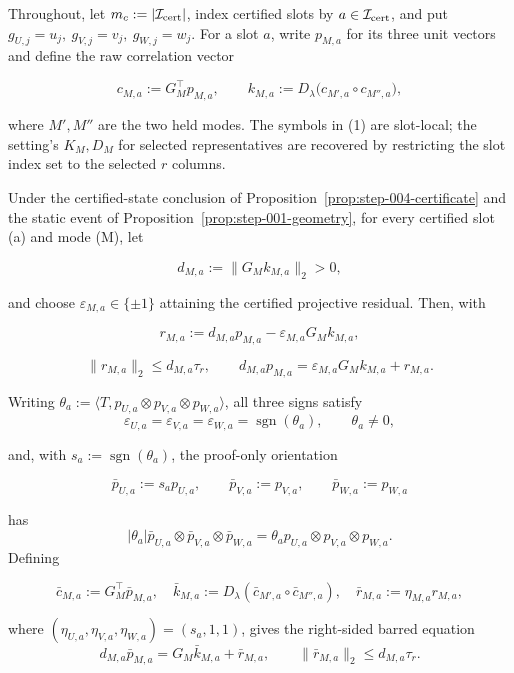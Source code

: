 Throughout, let $m_c:=|\mathcal I_{\rm cert}|$, index certified slots by
$a\in\mathcal I_{\rm cert}$, and put
$g_{U,j}=u_j,\ g_{V,j}=v_j,\ g_{W,j}=w_j$.  For a slot $a$, write
$p_{M,a}$ for its three unit vectors and define the raw correlation vector

\[
c_{M,a}:=G_M^\top p_{M,a},\qquad
k_{M,a}:=D_\lambda\bigl(c_{M',a}\circ c_{M'',a}\bigr),
\tag{1}
\]

where $M',M''$ are the two held modes.  The symbols in (1) are slot-local;
the setting's $K_M,D_M$ for selected representatives are recovered by
restricting the slot index set to the selected $r$ columns.


\begin{lemma}\label{lem:step-005-signed-equation}
Under the certified-state conclusion of Proposition~\ref{prop:step-004-certificate}
and the static event of Proposition~\ref{prop:step-001-geometry}, for every
certified slot (a) and mode (M), let

\[
d_{M,a}:=\|G_Mk_{M,a}\|_2>0,
\]

and choose $\varepsilon_{M,a}\in\{\pm1\}$ attaining the certified
projective residual.  Then, with

\[
r_{M,a}:=d_{M,a}p_{M,a}-\varepsilon_{M,a}G_Mk_{M,a},
\]

\[
\|r_{M,a}\|_2\le d_{M,a}\tau_r,
\qquad
d_{M,a}p_{M,a}=\varepsilon_{M,a}G_Mk_{M,a}+r_{M,a}.
\tag{2}
\]

Writing $\theta_a:=\langle T,p_{U,a}\otimes p_{V,a}\otimes p_{W,a}\rangle$,
all three signs satisfy
\[
\varepsilon_{U,a}=\varepsilon_{V,a}=\varepsilon_{W,a}
=\operatorname{sgn}(\theta_a),
\qquad \theta_a\ne0,
\tag{3}
\]

and, with $s_a:=\operatorname{sgn}(\theta_a)$, the proof-only orientation

\[
\bar p_{U,a}:=s_ap_{U,a},\qquad
\bar p_{V,a}:=p_{V,a},\qquad
\bar p_{W,a}:=p_{W,a}
\tag{4}
\]

has
\[
|\theta_a|\bar p_{U,a}\otimes\bar p_{V,a}\otimes\bar p_{W,a}
=\theta_a p_{U,a}\otimes p_{V,a}\otimes p_{W,a}.
\]
Defining

\[
\bar c_{M,a}:=G_M^\top\bar p_{M,a},\quad
\bar k_{M,a}:=D_\lambda(\bar c_{M',a}\circ\bar c_{M'',a}),\quad
\bar r_{M,a}:=\eta_{M,a}r_{M,a},
\]

where $(\eta_{U,a},\eta_{V,a},\eta_{W,a})=(s_a,1,1)$, gives the
right-sided barred equation
\[
d_{M,a}\bar p_{M,a}=G_M\bar k_{M,a}+\bar r_{M,a},
\qquad \|\bar r_{M,a}\|_2\le d_{M,a}\tau_r.
\tag{5}
\]


\end{lemma}
